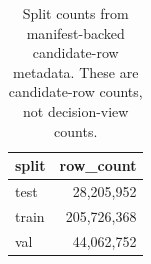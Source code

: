 \begin{table}[H]
  \centering
  \small
  \caption{Split counts from manifest-backed candidate-row metadata. These are candidate-row counts, not decision-view counts.}
  \label{tab:split-counts}
  \begin{tabular}{@{}lr@{}}
    \toprule
    split & row\_count \\
    \midrule
    test & 28,205,952 \\
    train & 205,726,368 \\
    val & 44,062,752 \\
    \bottomrule
  \end{tabular}
\end{table}
